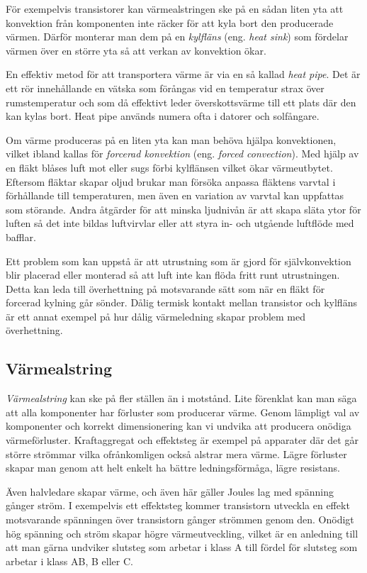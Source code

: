 För exempelvis transistorer kan värmealstringen ske på en sådan liten yta att
konvektion från komponenten inte räcker för att kyla bort den producerade
värmen.
Därför monterar man dem på en \emph{kylfläns} (eng. \emph{heat sink}) som
fördelar värmen över en större yta så att verkan av konvektion ökar.

En effektiv metod för att transportera värme är via en så kallad \emph{heat pipe}.
Det är ett rör innehållande en vätska som förångas vid en temperatur strax över
rumstemperatur och som då effektivt leder överskottsvärme till ett plats där den
kan kylas bort.
Heat pipe används numera ofta i datorer och solfångare.

Om värme produceras på en liten yta kan man behöva hjälpa konvektionen, vilket
ibland kallas för \emph{forcerad konvektion} (eng. \emph{forced convection}).
Med hjälp av en fläkt blåses luft mot eller sugs förbi kylflänsen vilket ökar
värmeutbytet.
Eftersom fläktar skapar oljud brukar man försöka anpassa fläktens varvtal i
förhållande till temperaturen, men även en variation av varvtal kan uppfattas
som störande.
Andra åtgärder för att minska ljudnivån är att skapa släta ytor för luften så
det inte bildas luftvirvlar eller att styra in- och utgående luftflöde med
bafflar.

Ett problem som kan uppstå är att utrustning som är gjord för självkonvektion
blir placerad eller monterad så att luft inte kan flöda fritt runt utrustningen.
Detta kan leda till överhettning på motsvarande sätt som när en fläkt för
forcerad kylning går sönder.
Dålig termisk kontakt mellan transistor och kylfläns är ett annat exempel på hur
dålig värmeledning skapar problem med överhettning.

\subsection{Värmealstring}

\emph{Värmealstring} kan ske på fler ställen än i motstånd. Lite förenklat
kan man säga att alla komponenter har förluster som producerar värme. Genom
lämpligt val av komponenter och korrekt dimensionering kan vi undvika att
producera onödiga värmeförluster. Kraftaggregat och effektsteg är exempel
på apparater där det går större strömmar vilka ofrånkomligen också alstrar
mera värme.
Lägre förluster skapar man genom att helt enkelt ha bättre ledningsförmåga,
lägre resistans.

Även halvledare skapar värme, och även här gäller Joules lag med spänning
gånger ström. I exempelvis ett effektsteg kommer transistorn utveckla en
effekt motsvarande spänningen över transistorn gånger strömmen genom den.
Onödigt hög spänning och ström skapar högre värmeutveckling, vilket är en
anledning till att man gärna undviker slutsteg som arbetar i klass A till fördel
för slutsteg som arbetar i klass AB, B eller C.


